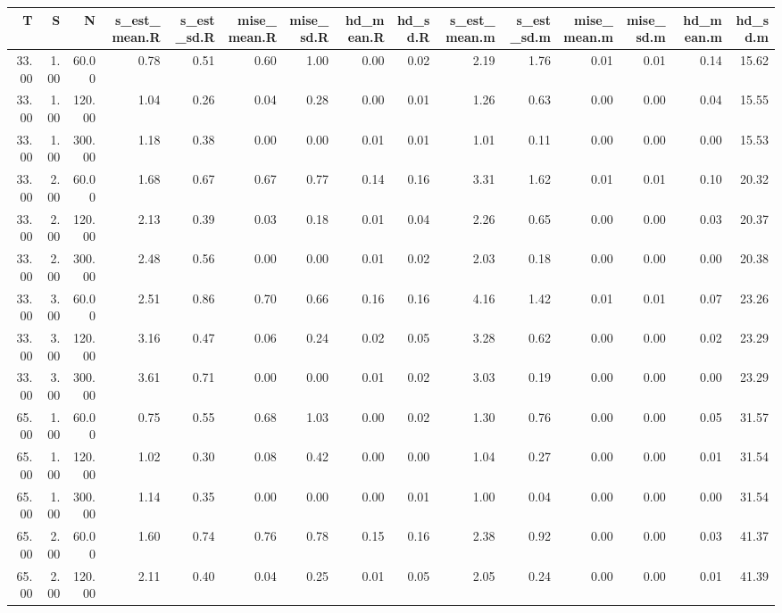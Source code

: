 \begin{table}[ht]
\centering
\begin{tabular}{rrrrrrrrrrrrrrr}
  \hline
T & S & N & s\_est\_mean.R & s\_est\_sd.R & mise\_mean.R & mise\_sd.R & hd\_mean.R & hd\_sd.R & s\_est\_mean.m & s\_est\_sd.m & mise\_mean.m & mise\_sd.m & hd\_mean.m & hd\_sd.m \\ 
  \hline
33.00 & 1.00 & 60.00 & 0.78 & 0.51 & 0.60 & 1.00 & 0.00 & 0.02 & 2.19 & 1.76 & 0.01 & 0.01 & 0.14 & 15.62 \\ 
  33.00 & 1.00 & 120.00 & 1.04 & 0.26 & 0.04 & 0.28 & 0.00 & 0.01 & 1.26 & 0.63 & 0.00 & 0.00 & 0.04 & 15.55 \\ 
  33.00 & 1.00 & 300.00 & 1.18 & 0.38 & 0.00 & 0.00 & 0.01 & 0.01 & 1.01 & 0.11 & 0.00 & 0.00 & 0.00 & 15.53 \\ 
  33.00 & 2.00 & 60.00 & 1.68 & 0.67 & 0.67 & 0.77 & 0.14 & 0.16 & 3.31 & 1.62 & 0.01 & 0.01 & 0.10 & 20.32 \\ 
  33.00 & 2.00 & 120.00 & 2.13 & 0.39 & 0.03 & 0.18 & 0.01 & 0.04 & 2.26 & 0.65 & 0.00 & 0.00 & 0.03 & 20.37 \\ 
  33.00 & 2.00 & 300.00 & 2.48 & 0.56 & 0.00 & 0.00 & 0.01 & 0.02 & 2.03 & 0.18 & 0.00 & 0.00 & 0.00 & 20.38 \\ 
  33.00 & 3.00 & 60.00 & 2.51 & 0.86 & 0.70 & 0.66 & 0.16 & 0.16 & 4.16 & 1.42 & 0.01 & 0.01 & 0.07 & 23.26 \\ 
  33.00 & 3.00 & 120.00 & 3.16 & 0.47 & 0.06 & 0.24 & 0.02 & 0.05 & 3.28 & 0.62 & 0.00 & 0.00 & 0.02 & 23.29 \\ 
  33.00 & 3.00 & 300.00 & 3.61 & 0.71 & 0.00 & 0.00 & 0.01 & 0.02 & 3.03 & 0.19 & 0.00 & 0.00 & 0.00 & 23.29 \\ 
  65.00 & 1.00 & 60.00 & 0.75 & 0.55 & 0.68 & 1.03 & 0.00 & 0.02 & 1.30 & 0.76 & 0.00 & 0.00 & 0.05 & 31.57 \\ 
  65.00 & 1.00 & 120.00 & 1.02 & 0.30 & 0.08 & 0.42 & 0.00 & 0.00 & 1.04 & 0.27 & 0.00 & 0.00 & 0.01 & 31.54 \\ 
  65.00 & 1.00 & 300.00 & 1.14 & 0.35 & 0.00 & 0.00 & 0.00 & 0.01 & 1.00 & 0.04 & 0.00 & 0.00 & 0.00 & 31.54 \\ 
  65.00 & 2.00 & 60.00 & 1.60 & 0.74 & 0.76 & 0.78 & 0.15 & 0.16 & 2.38 & 0.92 & 0.00 & 0.00 & 0.03 & 41.37 \\ 
  65.00 & 2.00 & 120.00 & 2.11 & 0.40 & 0.04 & 0.25 & 0.01 & 0.05 & 2.05 & 0.24 & 0.00 & 0.00 & 0.01 & 41.39 \\ 

\end{tabular}
\end{table}
